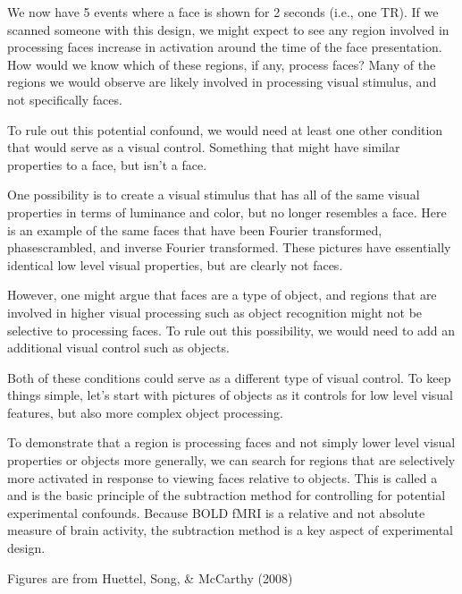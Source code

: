 \documentclass[letterpaper,10pt,english]{sphinxmanual}
\begin{document}
\noindent{}

We now have 5 events where a face is shown for 2 seconds (i.e., one TR). If we scanned someone with this design, we might expect to see any region involved in processing faces increase in activation around the time of the face presentation. How would we know which of these regions, if any,  process faces? Many of the regions we would observe are likely involved in processing  visual stimulus, and not specifically faces.

To rule out this potential confound, we would need at least one other condition that would serve as a visual control. Something that might have similar properties to a face, but isn’t a face.

One possibility is to create a visual stimulus that has all of the same visual properties in terms of luminance and color, but no longer resembles a face. Here is an example of the same faces that have been Fourier transformed, phase\sphinxhyphen{}scrambled, and inverse Fourier transformed. These pictures have essentially identical low level visual properties, but are clearly not faces.


However, one might argue that faces are a type of object, and regions that are involved in higher visual processing such as object recognition might not be selective to processing faces. To rule out this possibility, we would need to add an additional visual control such as objects.


Both of these conditions could serve as a different type of visual control. To keep things simple, let’s start with pictures of objects as it controls for low level visual features, but also more complex object processing.

To demonstrate that a region is processing faces and not simply lower level visual properties or objects more generally, we can search for regions that are selectively more activated in response to viewing faces relative to objects. This is called a  and is the basic principle of the subtraction method for controlling for potential experimental confounds. Because BOLD fMRI is a relative and not absolute measure of brain activity, the subtraction method is a key aspect of experimental design.

Figures are from Huettel, Song, \& McCarthy (2008)
\end{document}
